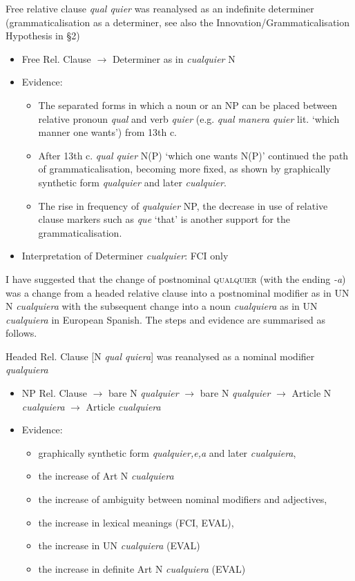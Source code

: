\ea \label{ex:key:327} %
  Free relative clause \textit{qual quier} was reanalysed as an indefinite determiner (grammaticalisation as a determiner, see also the Innovation/Grammaticalisation Hypothesis in §2)
  \begin{itemize}
  \item Free Rel. Clause $\rightarrow$ Determiner as in \textit{cualquier} N
  \item Evidence:
  \begin{itemize}
    \item The separated forms in which a noun or an NP can be placed between relative pronoun \textit{qual} and verb \textit{quier} (e.g. \textit{qual manera quier} lit. ‘which manner one wants’) from 13th c.
    \item After 13th c. \textit{qual quier} N(P) ‘which one wants N(P)’ continued the path of grammaticalisation, becoming more fixed, as shown by graphically synthetic form \textit{qualquier} and later \textit{cualquier}.
    \item The rise in frequency of \textit{qualquier} NP, the decrease in use of relative clause markers such as \textit{que} ‘that’ is another support for the grammaticalisation.
  \end{itemize}
  \item Interpretation of Determiner \textit{cualquier}: FCI only
  \end{itemize}

\z

I have suggested that the change of postnominal \textsc{qualquier} (with the ending \textit{{}-a}) was a change from a headed relative clause into a postnominal modifier as in \textsc{UN} N \textit{cualquiera} with the subsequent change into a noun \textit{cualquiera} as in \textsc{UN} \textit{cualquiera} in European Spanish. The steps and evidence are summarised as follows.

\ea \label{ex:key:328}
  Headed Rel. Clause [N \textit{qual quiera}] was reanalysed as a nominal modifier \textit{qualquiera}
    \begin{itemize}
    \item NP Rel. Clause $\rightarrow$ bare N \textit{qualquier} $\rightarrow$ bare N \textit{qualquier} $\rightarrow$ Article N \textit{cualquiera} $\rightarrow$ Article \textit{cualquiera}
    \item Evidence: 
      \begin{itemize}
      \item graphically synthetic form \textit{qualquier,e,a} and later \textit{cualquiera},
      \item the increase of Art N \textit{cualquiera}
      \item the increase of ambiguity between nominal modifiers and adjectives,
      \item the increase in lexical meanings (FCI, EVAL),
      \item the increase in UN \textit{cualquiera} (EVAL)
      \item the increase in definite Art N \textit{cualquiera} (EVAL)
      \end{itemize}
    \end{itemize}
\z

